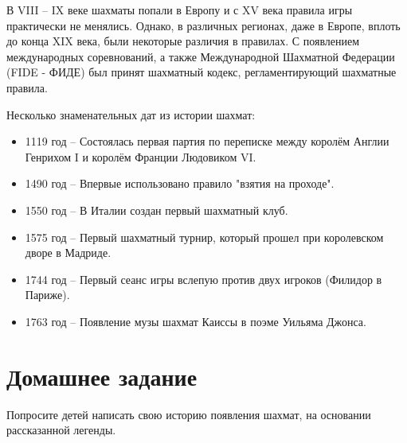 В VIII -- IX веке шахматы попали в Европу и с XV века правила игры практически не менялись. Однако, в различных регионах, даже в Европе, вплоть до конца XIX века, были некоторые различия в правилах. С появлением международных соревнований, а также Международной Шахматной Федерации (FIDE - ФИДЕ) был принят шахматный кодекс, регламентирующий шахматные правила.

Несколько знаменательных дат из истории шахмат:
\begin{itemize}
\setlength\itemsep{-0.5em}
\item 1119 год -- Состоялась первая партия по переписке между королём Англии Генрихом I и королём Франции Людовиком VI. 
\item 1490 год -- Впервые использовано правило "взятия на проходе". 
\item 1550 год -- В Италии создан первый шахматный клуб. 
\item 1575 год -- Первый шахматный турнир, который прошел при королевском дворе в Мадриде. 
\item 1744 год -- Первый сеанс игры вслепую против двух игроков (Филидор в Париже).
\item 1763 год -- Появление музы шахмат Каиссы в поэме Уильяма Джонса.
\end{itemize}
 
\section{Домашнее задание}

Попросите детей написать свою историю появления шахмат, на основании рассказанной легенды.
